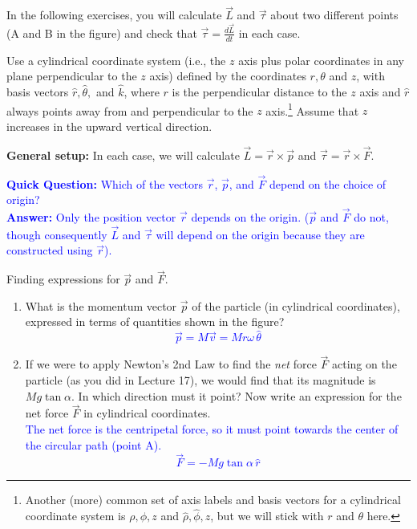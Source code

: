 \documentclass[11pt, letterpaper, openany]{book}
\newenvironment{exercise}[1][Exercise]{%
  \tcolorbox[blanker, breakable, left=1em,
    before skip=1em, after skip=1em,
    borderline west={3pt}{0pt}{PhysNavy},
    colback=PhysCream,
    before upper={\textcolor{PhysNavy}{\sffamily\bfseries #1:}\space}
  ]%
}{%
  \endtcolorbox%
}
\begin{document}
In the following exercises, you will calculate $\vec{L}$ and $\vec{\tau}$ about two different points (A and B in the figure) and check that $\vec{\tau} = \frac{d\vec{L}}{dt}$ in each case.

Use a cylindrical coordinate system (i.e., the $z$ axis plus polar coordinates in any plane perpendicular to the $z$ axis) defined by the coordinates $r, \theta$ and $z$, with basis vectors $\hat{r}, \hat{\theta},$ and $\hat{k}$, where $r$ is the perpendicular distance to the $z$ axis and $\hat{r}$ always points away from and perpendicular to the $z$ axis.\footnote{Another (more) common set of axis labels and basis vectors for a cylindrical coordinate system is $\rho, \phi, z$ and $\hat{\rho}, \hat{\phi}, \hat{z}$, but we will stick with $r$ and $\theta$ here.} Assume that $z$ increases in the upward vertical direction.

\textbf{General setup:} In each case, we will calculate $\vec{L} = \vec{r} \times \vec{p}$ and $\vec{\tau} = \vec{r} \times \vec{F}$.

\textcolor{blue}{\textbf{Quick Question:} Which of the vectors $\vec{r}$, $\vec{p}$, and $\vec{F}$ depend on the choice of origin? \\
\textbf{Answer:} Only the position vector $\vec{r}$ depends on the origin. ($\vec{p}$ and $\vec{F}$ do not, though consequently $\vec{L}$ and $\vec{\tau}$ will depend on the origin because they are constructed using $\vec{r}$).}

\begin{exercise}[Exercise 8]
Finding expressions for $\vec{p}$ and $\vec{F}$.
\begin{enumerate}[label=(\alph*)]
    \item What is the momentum vector $\vec{p}$ of the particle (in cylindrical coordinates), expressed in terms of quantities shown in the figure? \\
    \textcolor{blue}{\[ \vec{p} = M\vec{v} = Mr\omega\,\hat{\theta} \]}
    
    \item If we were to apply Newton's 2nd Law to find the \textit{net} force $\vec{F}$ acting on the particle (as you did in Lecture 17), we would find that its magnitude is $Mg\tan\alpha$. In which direction must it point? Now write an expression for the net force $\vec{F}$ in cylindrical coordinates. \\
    \textcolor{blue}{The net force is the centripetal force, so it must point towards the center of the circular path (point A). \\
    \[ \vec{F} = -Mg\tan\alpha\,\hat{r} \]}
\end{enumerate}
\end{exercise}
\end{document}
